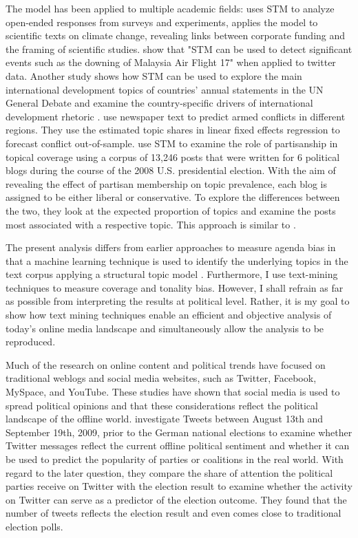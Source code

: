 \documentclass[12pt,a4paper,notitlepage]{article}
\begin{document}
The model has been applied to multiple academic fields: \citet{roberts_structural_2014} uses STM to analyze open-ended responses from surveys and experiments, \citet{farrell_corporate_2016} applies the model to scientific texts on climate change, revealing links between corporate funding and the framing of scientific studies. \citet{mishler_using_2015} show that "STM can be used to detect significant events such as the downing of Malaysia Air Flight 17" when applied to twitter data. Another study shows how STM can be used to explore the main international development topics of countries' annual statements in the UN General Debate and examine the country-specific drivers of international development rhetoric \citep{baturo_what_2017}. \citet{mueller_reading_2016} use newspaper text to predict armed conflicts in different regions. They use the estimated topic shares in linear fixed effects regression to forecast conflict out-of-sample. \citet{roberts_navigating_2016} use STM to examine the role of partisanship in topical coverage using a corpus of 13,246 posts that were written for 6 political blogs during the course of the 2008 U.S. presidential election. With the aim of revealing the effect of partisan membership on topic prevalence, each blog is assigned to be either liberal or conservative. To explore the differences between the two, they look at the expected proportion of topics and examine the posts most associated with a respective topic. This approach is similar to \citet{roberts_model_2016}. 

The present analysis differs from earlier approaches to measure agenda bias in that a machine learning technique is used to identify the underlying topics in the text corpus applying a structural topic model \citep{roberts_model_2016}. Furthermore, I use text-mining techniques to measure coverage and tonality bias. However, I shall refrain as far as possible from interpreting the results at political level. Rather, it is my goal to show how text mining techniques enable an efficient and objective analysis of today's online media landscape and simultaneously allow the analysis to be reproduced. 


Much of the research on online content and political trends have focused on traditional weblogs and social media websites, such as Twitter, Facebook, MySpace, and YouTube. These studies have shown that social media is used to spread political opinions and that these considerations reflect the political landscape of the offline world. \citet{tumasjan_predicting_2010} investigate Tweets between August 13th and September 19th, 2009, prior to the German national elections to examine whether Twitter messages reflect the current offline political sentiment and whether it can be used to predict the popularity of parties or coalitions in the real world. With regard to the later question, they compare the share of attention the political parties receive on Twitter with the election result to examine whether the activity on Twitter can serve as a predictor of the election outcome. They found that the number of tweets reflects the election result and even comes close to traditional election polls.
\end{document}
